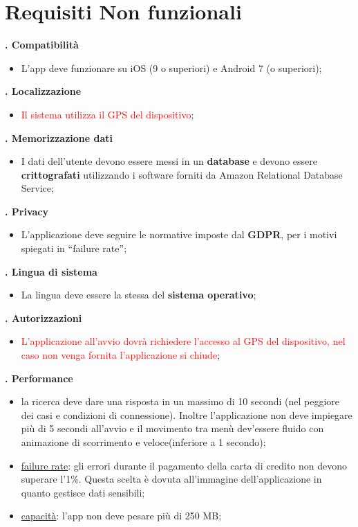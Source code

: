 \section{Requisiti Non funzionali}

\textbf{. Compatibilità}
\begin{itemize}
    \item L’app deve funzionare su iOS (9 o superiori) e Android 7 (o superiori); 
\end{itemize}
\textbf{. Localizzazione}
\begin{itemize}
    \item \textcolor{red}{Il sistema utilizza il GPS del dispositivo};
\end{itemize}
\textbf{. Memorizzazione dati}
\begin{itemize}
    \item I dati dell’utente devono essere messi in un \textbf{database} e devono essere \textbf{crittografati} utilizzando i software forniti da Amazon Relational Database Service;
\end{itemize}
\textbf{. Privacy}
\begin{itemize}
    \item L’applicazione deve seguire le normative imposte dal \textbf{GDPR}, per i motivi spiegati in “failure rate”;
\end{itemize}
\textbf{. Lingua di sistema}
\begin{itemize}
    \item La lingua deve essere la stessa del \textbf{sistema operativo};
\end{itemize}
\textbf{. Autorizzazioni}
\begin{itemize}
    \item \textcolor{red}{L’applicazione all’avvio dovrà richiedere l’accesso al GPS del dispositivo, nel caso non venga fornita l’applicazione si chiude};
\end{itemize}
\textbf{. Performance}
\begin{itemize}
    \item la ricerca deve dare una risposta in un massimo di 10 secondi (nel peggiore dei casi e condizioni di connessione). Inoltre l’applicazione non deve impiegare più di 5 secondi all’avvio e il movimento tra menù dev’essere fluido con animazione di scorrimento e veloce(inferiore a 1 secondo);
    \item \underline{failure rate}: gli errori durante il pagamento della carta di credito non devono superare l’1\%. Questa scelta è dovuta all’immagine dell’applicazione in quanto gestisce dati sensibili;
    \item \underline{capacità}: l’app non deve pesare più di 250 MB;
\end{itemize}
